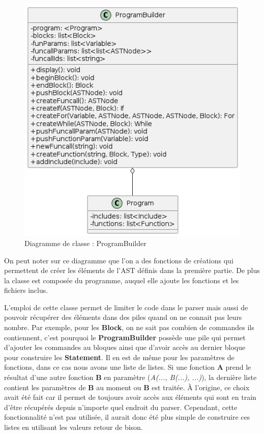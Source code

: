 \documentclass[a4paper]{article}%
\begin{document}
\begin{figure}[h]
  \begin{center}
  \includegraphics[scale=0.5]{../ressources/diagrams/program-builder.png}
  \caption{Diagramme de classe : ProgramBuilder}
  \end{center}
\end{figure}

On peut noter sur ce diagramme que l'on a des fonctions de créations qui
permettent de créer les éléments de l'AST définis dans la première partie. De
plus la classe est composée du programme, auquel elle ajoute les fonctions et les
fichiers inclus. %

L'emploi de cette classe permet de limiter le code dans le \gls{parser} mais aussi de
pouvoir récupérer des éléments dans des piles quand on ne connait pas leurs
nombre. Par exemple, pour les \textbf{Block}, on ne sait pas combien de
commandes ils contiennent, c'est pourquoi le \textbf{ProgramBuilder} possède une
pile qui permet d'ajouter les commandes au bloques ainsi que d'avoir accès au
dernier bloque pour construire les \textbf{Statement}. Il en est de même pour
les paramètres de fonctions, dans ce cas nous avons une liste de listes. Si une
fonction \textbf{A} prend le résultat d'une autre fonction \textbf{B} en
paramètre (\textit{A(..., B(...), ...)}), la dernière liste contient les
paramètres de \textbf{B} au moment ou \textbf{B} est traitée. À l'origine, ce
choix avait été fait car il permet de toujours avoir accès aux éléments qui sont
en train d'être récupérés depuis n'importe quel endroit du \gls{parser}. Cependant,
cette fonctionnalité n'est pas utilisée, il aurait donc été plus simple de
construire ces listes en utilisant les valeurs retour de bison.\\
\end{document}
